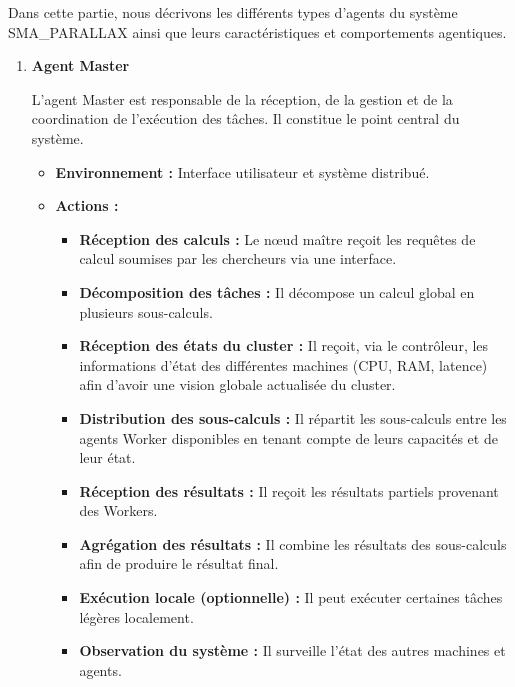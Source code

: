 \documentclass[12pt,a4paper]{report}
\theoremstyle{definition}
\begin{document}
Dans cette partie, nous décrivons les différents types d’agents du système SMA\_PARALLAX ainsi que leurs caractéristiques et comportements agentiques.

\begin{enumerate}

\item \textbf{Agent Master}

L’agent Master est responsable de la réception, de la gestion et de la coordination de l’exécution des tâches. Il constitue le point central du système.

\begin{itemize}
    \item [$\bullet$]\textbf{Environnement :} Interface utilisateur et système distribué.

    \item [$\bullet$]\textbf{Actions :}
    \begin{itemize}
        \item[$-$] \textbf{Réception des calculs :} Le nœud maître reçoit les requêtes de calcul soumises par les chercheurs via une interface.
        
\item[$-$] \textbf{Décomposition des tâches :} Il décompose un calcul global en plusieurs sous-calculs.
        
\item[$-$] \textbf{Réception des états du cluster :} Il reçoit, via le contrôleur, les informations d’état des différentes machines (CPU, RAM, latence) afin d’avoir une vision globale actualisée du cluster.
        
\item[$-$] \textbf{Distribution des sous-calculs :} Il répartit les sous-calculs entre les agents Worker disponibles en tenant compte de leurs capacités et de leur état.
        
\item[$-$] \textbf{Réception des résultats :} Il reçoit les résultats partiels provenant des Workers.
        
\item[$-$] \textbf{Agrégation des résultats :} Il combine les résultats des sous-calculs afin de produire le résultat final.
        
\item[$-$] \textbf{Exécution locale (optionnelle) :} Il peut exécuter certaines tâches légères localement.
        
\item[$-$] \textbf{Observation du système :} Il surveille l’état des autres machines et agents.
        

\end{itemize}
\end{itemize}
\end{enumerate}
\end{document}
